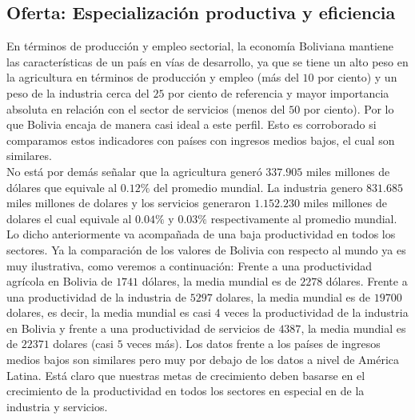     \subsection{Oferta: Especialización productiva y eficiencia}
    En términos de producción y empleo sectorial, la economía Boliviana mantiene las características de un país en vías de desarrollo, ya que se tiene un alto peso en la agricultura en términos de producción y empleo (más del $10$ por ciento) y un peso de la industria cerca del $25$ por ciento de referencia y mayor importancia absoluta en relación con el sector de servicios (menos del $50$ por ciento). Por lo que Bolivia encaja de manera casi ideal a este perfil. Esto es corroborado si comparamos estos indicadores con países con ingresos medios bajos, el cual son similares.\\
    No está por demás señalar que la agricultura generó $337.905$ miles millones de dólares que equivale al $0.12 \%$ del promedio mundial. La industria genero $831.685$ miles millones de dolares y los servicios generaron $1.152.230$ miles millones de dolares el cual equivale al $0.04\%$ y $0.03\%$ respectivamente al promedio mundial.\\
    Lo dicho anteriormente va acompañada de una baja productividad en todos los sectores. Ya la comparación de los valores de Bolivia con respecto al mundo ya es muy ilustrativa, como veremos a continuación: Frente a una productividad agrícola en Bolivia de $1741$ dólares, la media mundial es de $2278$ dólares. Frente a una productividad  de la industria de $5297$ dolares, la media mundial es de $19700$ dolares, es decir, la media mundial es casi 4 veces la productividad de la industria en Bolivia y frente a una productividad de servicios de $4387$, la media mundial es de $22371$ dolares (casi $5$ veces más). Los datos frente a los países de ingresos medios bajos son similares pero muy por debajo de los datos a nivel de América Latina. Está claro que nuestras metas de crecimiento deben basarse en el crecimiento de la productividad en todos los sectores en especial en de la industria y servicios.\\


